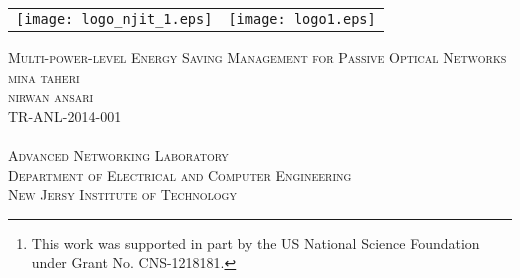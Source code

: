 \documentclass[11pt,english,12pt,onecolumn, draftcls]{IEEEtran}
\theoremstyle{plain}
\theoremstyle{definition}
\begin{document}
\begin{titlepage}


\begin{tabular}{l        r}

\texttt{[image: logo\_njit\_1.eps]} \hspace{6cm} & \texttt{[image: logo1.eps]}

\end{tabular}

\vspace{2cm}






\begin{center}


\textsc{\LARGE Multi-power-level Energy Saving Management for Passive Optical Networks}\\[1.5cm]

{\Large \textsc{mina taheri}}\\ {\Large \textsc{nirwan ansari}}\\[3cm] 





{}
{\textsc{TR-ANL-2014-001}\\
\large {}}\\[3cm]

{\textsc{Advanced Networking Laboratory}}\\
{\textsc{Department of Electrical and Computer Engineering}}\\
{\textsc{New Jersy Institute of Technology}}\\[1.5cm]
\vfill

\end{center}

\end{titlepage}



\author{





\thanks{This work was supported in part by the US National Science Foundation under Grant No. CNS-1218181.}


}
\end{document}
